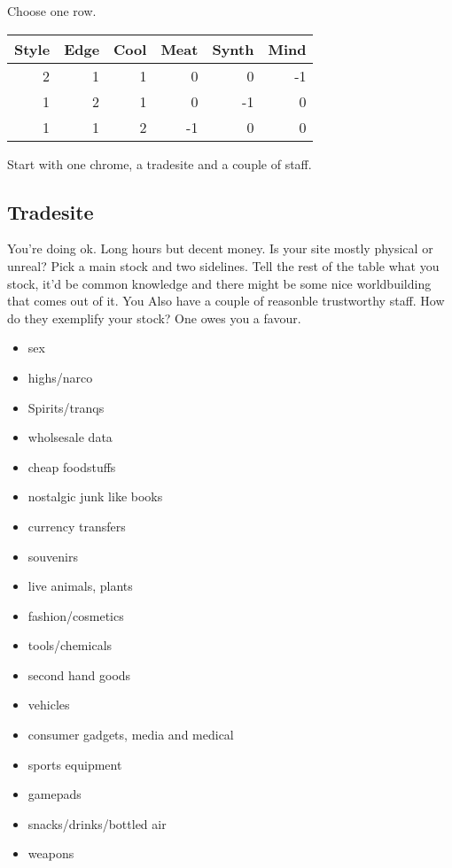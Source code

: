 \documentclass{tufte-book}
\begin{document}
Choose one row.
\begin{table}[ht]
\centering
{}\selectfont
\begin{tabular}{rrrrrr}
\toprule
Style & Edge & Cool & Meat & Synth & Mind\\
\midrule
2&1&1&0&0&-1\\
1&2&1&0&-1&0\\
1&1&2&-1&0&0\\
\bottomrule
\end{tabular}
\end{table}

Start with one chrome, a tradesite and a couple of staff.

\subsection{Tradesite}
You're doing ok. Long hours but decent money. Is your site mostly physical or unreal? Pick a main stock and two sidelines.
Tell the rest of the table what you stock, it'd be common knowledge and there might be some nice worldbuilding that comes out of it.
 You Also have a couple of reasonble trustworthy staff. How do they exemplify your stock? One owes you a favour.

\begin{multicols}{3}
\begin{itemize}
\item sex
\item highs/narco
\item Spirits/tranqs
\item wholsesale data
\item cheap foodstuffs
\item nostalgic junk like books
\item currency transfers
\item souvenirs
\item live animals, plants
\item fashion/cosmetics
\item tools/chemicals
\item second hand goods
\item vehicles
\item consumer gadgets, media and medical
\item sports equipment
\item gamepads
\item snacks/drinks/bottled air
\item weapons
\end{itemize}
\end{multicols}
\end{document}
